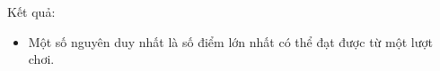 Kết quả:
\begin{itemize}
	\item Một số nguyên duy nhất là số điểm lớn nhất có thể đạt được từ một lượt chơi.
\end{itemize}